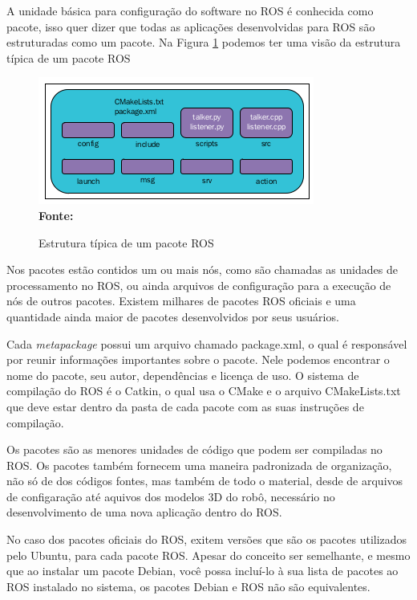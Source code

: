 A unidade básica para configuração do software no ROS é conhecida como pacote, isso quer dizer que todas as aplicações desenvolvidas para ROS são estruturadas como um pacote. Na Figura \ref{fig:rospacotestrut} podemos ter uma visão da estrutura típica de um pacote ROS

\begin{figure}[ht]
	\caption{Estrutura típica de um pacote ROS}
	\begin{center}
		\includegraphics[scale=0.8]{imagens/rospackagestruture.png}\\
		{\small \textbf{Fonte:} }
    \end{center}\label{fig:rospacotestrut}
\end{figure}

Nos pacotes estão contidos um ou mais nós, como são chamadas as unidades de processamento no ROS, ou ainda arquivos de configuração para a execução de nós de outros pacotes. Existem milhares de pacotes ROS oficiais e uma quantidade ainda maior de pacotes desenvolvidos por seus usuários. 

Cada \textit{metapackage} possui um arquivo chamado package.xml, o qual é responsável por reunir informações importantes sobre o pacote. Nele podemos encontrar o nome do pacote, seu autor, dependências e licença de uso. O sistema de compilação do ROS é o Catkin, o qual usa o CMake e o arquivo CMakeLists.txt que deve estar dentro da pasta de cada pacote com as suas instruções de compilação. 

Os pacotes são as menores unidades de código que podem ser compiladas no ROS\@. Os pacotes também fornecem uma maneira padronizada de organização, não só de dos códigos fontes, mas também de todo o material, desde de arquivos de configaração até aquivos dos modelos 3D do robô, necessário no desenvolvimento de uma nova aplicação dentro do ROS\@. 






No caso dos pacotes oficiais do ROS, exitem versões que são os pacotes utilizados pelo Ubuntu, para cada pacote ROS\@. Apesar do conceito ser semelhante, e mesmo que ao instalar um pacote Debian, você possa incluí-lo à sua lista de pacotes ao ROS instalado no sistema, os pacotes Debian e ROS não são equivalentes. 











